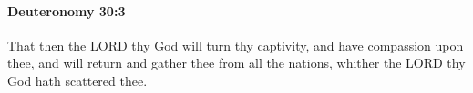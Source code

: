 
		\paragraph{Deuteronomy 30:3} %
			\label{DEUTERONOMY-30-3}

			That then the LORD thy God will turn thy captivity, and have compassion upon thee, and will return and gather thee from all the nations, whither the LORD thy God hath scattered thee.


